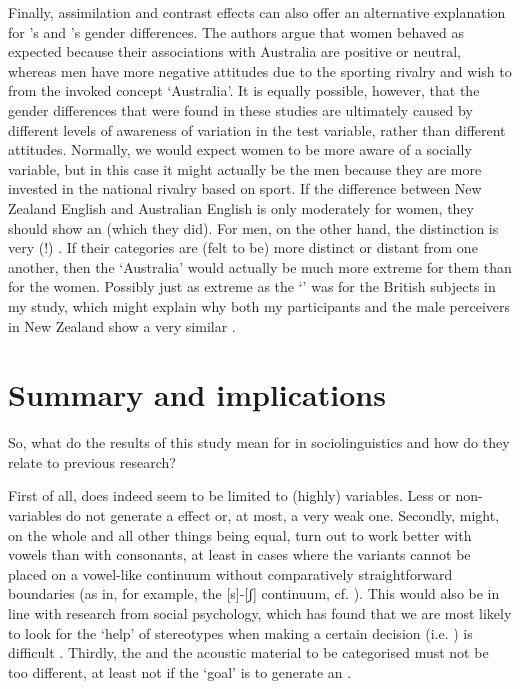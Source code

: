Finally, assimilation and contrast effects can also offer an alternative explanation for \textcite{hayetal2006a}'s and \textcite{haydrager2010}'s gender differences.
The authors argue that women behaved as expected because their associations with Australia are positive or neutral, whereas men have more negative attitudes due to the sporting rivalry and wish to  from the invoked concept `Australia'.
It is equally possible, however, that the gender differences that were found in these studies are ultimately caused by different levels of awareness of variation in the test variable, rather than different attitudes.
Normally, we would expect women to be more aware of a socially  variable, but in this case it might actually be the men because they are more invested in the national rivalry based on sport.
If the difference between New Zealand English and Australian English is only moderately  for women, they should show an  (which they did).
For men, on the other hand, the distinction is very (!) .
If their categories are (felt to be) more distinct or distant from one another, then the  `Australia' would actually be much more extreme for them than for the women.
Possibly just as extreme as the  `' was for the British subjects in my study, which might explain why both my participants and the male perceivers in New Zealand show a very similar .

	\section{Summary and implications}

So, what do the results of this study mean for   in sociolinguistics and how do they relate to previous research?

First of all,  does indeed seem to be limited to (highly)  variables.
Less or non- variables do not generate a  effect or, at most, a very weak one.
Secondly,  might, on the whole and all other things being equal, turn out to work better with vowels than with consonants, at least in cases where the  variants cannot be placed on a vowel-like continuum without comparatively straightforward boundaries (as in, for example, the [s]-[ʃ] continuum, cf. \citealt{strand1999}).
This would also be in line with research from social psychology, which has found that we are most likely to look for the `help' of stereotypes when making a certain decision (i.e. ) is difficult \parencite[cf.][28]{petersensix2008}.
Thirdly, the  and the acoustic material to be categorised must not be too different, at least not if the `goal' is to generate an .

